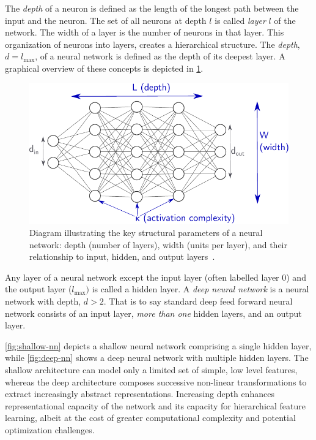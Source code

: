             The \emph{depth} of a neuron is defined as the length of the longest path between the input and the neuron.
            The set of all neurons at depth \(l\) is called \emph{layer} \(l\) of the network.
            The width of a layer is the number of neurons in that layer.
            This organization of neurons into layers, creates a hierarchical structure.
            The \emph{depth}, \(d = l_{\max}\), of a neural network is defined as the depth of its deepest layer.
            A graphical overview of these concepts is depicted in \cref{fig:nn-concepts}.
            \begin{figure}
                \centering
                \includegraphics[width=\linewidth]{figures/chapter-03/CPWLNet_Descriptor.pdf}
                \caption[Neural network depth & width illustration]{Diagram illustrating the key structural parameters of a neural network: depth (number of layers), width (units per layer), and their relationship to input, hidden, and output layers~\cite{goujon_number_2023}.}
                \label{fig:nn-concepts}
            \end{figure}
            Any layer of a neural network except the input layer (often labelled layer \(0\)) and the output layer (\(l_{\max})\) is called a hidden layer.
            A \emph{deep neural network} is a neural network with depth, \(d > 2\).
            That is to say standard deep feed forward neural network consists of an input layer, \emph{more than one} hidden layers, and an output layer.%
            
            \cref{fig:shallow-nn} depicts a shallow neural network comprising a single hidden layer, while \cref{fig:deep-nn} shows a deep neural network with multiple hidden layers.
            The shallow architecture can model only a limited set of simple, low level features, whereas the deep architecture composes successive non-linear transformations to extract increasingly abstract representations.
            Increasing depth enhances representational capacity of the network and its capacity for hierarchical feature learning, albeit at the cost of greater computational complexity and potential optimization challenges.

